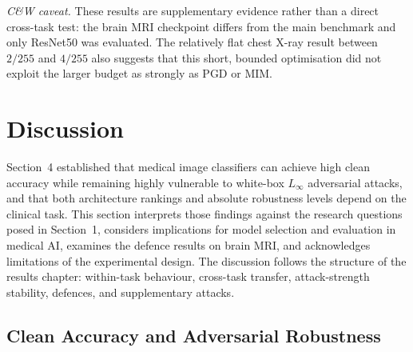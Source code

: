 \documentclass[12pt,a4paper,oneside]{report}
\begin{document}
\noindent\textit{C\&W caveat.} These results are supplementary evidence rather than a direct cross-task test: the brain MRI checkpoint differs from the main benchmark and only ResNet50 was evaluated. The relatively flat chest X-ray result between $2/255$ and $4/255$ also suggests that this short, bounded optimisation did not exploit the larger budget as strongly as PGD or MIM.

\chapter{Discussion}
\label{ch:discussion}


Section~4 established that medical image classifiers can achieve high clean accuracy while remaining highly vulnerable to white-box $L_\infty$ adversarial attacks, and that both architecture rankings and absolute robustness levels depend on the clinical task. This section interprets those findings against the research questions posed in Section~1, considers implications for model selection and evaluation in medical AI, examines the defence results on brain MRI, and acknowledges limitations of the experimental design. The discussion follows the structure of the results chapter: within-task behaviour, cross-task transfer, attack-strength stability, defences, and supplementary attacks.

\section{Clean Accuracy and Adversarial Robustness}
\label{sec:disc-clean-robust}

\end{document}
